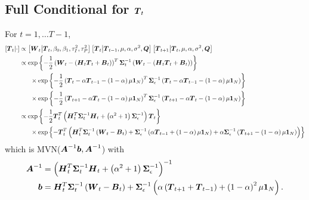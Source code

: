 \documentclass{article}\usepackage[]{graphicx}\usepackage[]{color}
\def\bm#1{\mbox{\boldmath $#1$}}
\begin{document}
\subsection{Full Conditional for $\bm{T}_t$}
%
For $t = 1, \ldots T - 1$,
%
\begin{align*}
%
\left[ \bm{T}_t \middle| \cdot \right] & \propto \left[ \bm{W}_t \middle| \bm{T}_t, \beta_0, \beta_1, \tau^2_I, \tau^2_P \right] \left[ \bm{T}_t \middle| \bm{T}_{t - 1}, \mu, \alpha, \sigma^2, \bm{Q} \right] \left[ \bm{T}_{t + 1} \middle| \bm{T}_t, \mu, \alpha, \sigma^2, \bm{Q} \right]\\
%
& \propto \exp{ \left\{ - \frac{1} {2} \left( \bm{W}_t - \left( \bm{H}_t \bm{T}_t + \bm{B}_t \right) \right)^T \bm{\Sigma}_t^{ - 1} \left( \bm{W}_t - \left( \bm{H}_t \bm{T}_t + \bm{B}_t \right)  \right) \right\} }\\
& \hspace{6mm} \times \exp{ \left\{ - \frac{1} {2} \left( \bm{T}_t - \alpha \bm{T}_{t - 1} - \left( 1 - \alpha \right) \mu \bm{1}_N \right)^T \bm{\Sigma}_\epsilon^{ - 1} \left( \bm{T}_t - \alpha \bm{T}_{t - 1} - \left( 1 - \alpha \right) \mu \bm{1}_N \right) \right\} }\\
& \hspace{6mm} \times \exp{ \left\{ - \frac{1} {2} \left( \bm{T}_{t + 1} - \alpha \bm{T}_t - \left( 1 - \alpha \right) \mu \bm{1}_N \right)^T \bm{\Sigma}_\epsilon^{ - 1} \left( \bm{T}_{t + 1} - \alpha \bm{T}_t - \left( 1 - \alpha \right) \mu \bm{1}_N \right) \right\} }\\
%
& \propto \exp{ \left\{ - \frac{1} {2} \bm{T}_t^T \left( \bm{H}_t^T \bm{\Sigma}_t^{ - 1} \bm{H}_t + \left( \alpha^2 + 1 \right) \bm{\Sigma}_\epsilon^{ - 1} \right) \bm{T}_t \right\} }\\
& \hspace{6mm} \times \exp{ \left\{ - \bm{T}_t^T \left( \bm{H}_t^T \bm{\Sigma}_t^{ - 1} \left( \bm{W}_t - \bm{B}_t \right) + \bm{\Sigma}_\epsilon^{ - 1} \left( \alpha \bm{T}_{t - 1} + \left( 1 - \alpha \right) \mu \bm{1}_N \right) + \alpha \bm{\Sigma}_\epsilon^{ - 1} \left( \bm{T}_{t + 1} - \left( 1 - \alpha \right) \mu \bm{1}_N \right) \right) \right\} }
%
\end{align*}
%
which is MVN($\bm{A}^{ - 1}\bm{b}, \bm{A}^{ - 1}$) with \\
%
\begin{align*}
%
\bm{A}^{ - 1} & = \left( \bm{H}_t^T \bm{\Sigma}_t^{ - 1} \bm{H}_t + \left( \alpha^2 + 1 \right) \bm{\Sigma}_\epsilon^{ - 1} \right)^{ - 1} \\ 
%
\bm{b} & = \bm{H}_t^T \bm{\Sigma}_t^{ - 1} \left( \bm{W}_t - \bm{B}_t \right) + \bm{\Sigma}_\epsilon^{ - 1} \left( \alpha \left( \bm{T}_{t + 1} + \bm{T}_{t - 1} \right) + \left( 1 - \alpha \right)^2 \mu \bm{1}_N \right).\\
%
\end{align*}
\end{document}
